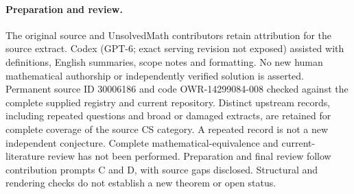 \documentclass[11pt]{article}
\begin{document}
\paragraph{Preparation and review.}
The original source and UnsolvedMath contributors retain attribution for the source extract. Codex (GPT-6; exact serving revision not exposed) assisted with definitions, English summaries, scope notes and formatting. No new human mathematical authorship or independently verified solution is asserted. Permanent source ID 30006186 and code OWR-14299084-008 checked against the complete supplied registry and current repository. Distinct upstream records, including repeated questions and broad or damaged extracts, are retained for complete coverage of the source CS category. A repeated record is not a new independent conjecture. Complete mathematical-equivalence and current-literature review has not been performed. Preparation and final review follow contribution prompts C and D, with source gaps disclosed. Structural and rendering checks do not establish a new theorem or open status.
\label{end:30006186}
\end{document}
